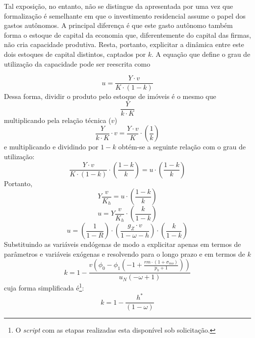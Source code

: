 
Tal exposição, no entanto, não se distingue da apresentada por \textcite{freitas_growth_2015} uma vez que formalização é semelhante em que o investimento residencial assume o papel dos gastos autônomos. A principal diferença é que este gasto autônomo também forma o estoque de capital da economia que, diferentemente do capital das firmas, não cria capacidade produtiva. Resta, portanto, explicitar a dinâmica entre este dois estoques de capital distintos, captados por $k$. A equação que define o grau de utilização da capacidade pode ser reescrita como

$$
u = \frac{Y\cdot v}{K \cdot (1-k)}
$$
Dessa forma, dividir o produto pelo estoque de imóveis é o mesmo que
$$
\frac{Y}{k\cdot K}
$$
multiplicando pela relação técnica ($v$)
$$
\frac{Y}{k\cdot K}\cdot v = \frac{Y\cdot v}{K}\cdot \left(\frac{1}{k}\right)
$$
e multiplicando e dividindo por $1-k$ obtém-se a seguinte relação com o grau de utilização:
$$
\frac{Y\cdot v}{K\cdot (1-k)}\cdot \left(\frac{1-k}{k}\right) = u \cdot \left(\frac{1-k}{k}\right)
$$
Portanto,
$$
Y\frac{v}{K_h} =  u \cdot \left(\frac{1-k}{k}\right)
$$
$$
u = Y\frac{v}{K_h} \cdot \left(\frac{k}{1-k}\right)
$$
\begin{equation}
u = \left(\frac{1}{1-R}\right)\cdot\left(\frac{g_Z\cdot v}{1-\omega- h}\right)\cdot\left(\frac{k}{1-k}\right)
\end{equation}
Substituindo as variáveis endógenas de modo a explicitar apenas em termos de parâmetros e variáveis exógenas e resolvendo para o longo prazo e em termos de $k$
\begin{equation}
\label{kAnali}
k = 1 - \frac{v \left(\phi_{0} - \phi_{1} \left(-1 + \frac{rm\cdot(1+\sigma_{mo})}{\dot p_h + 1}\right)\right)}{u_N \left(- \omega + 1\right)}
\end{equation}
cuja forma simplificada é\footnote{O \textit{script} com as etapas realizadas esta disponível sob solicitação.}:
$$
k = 1 - \frac{h^*}{(1 - \omega)}
$$

